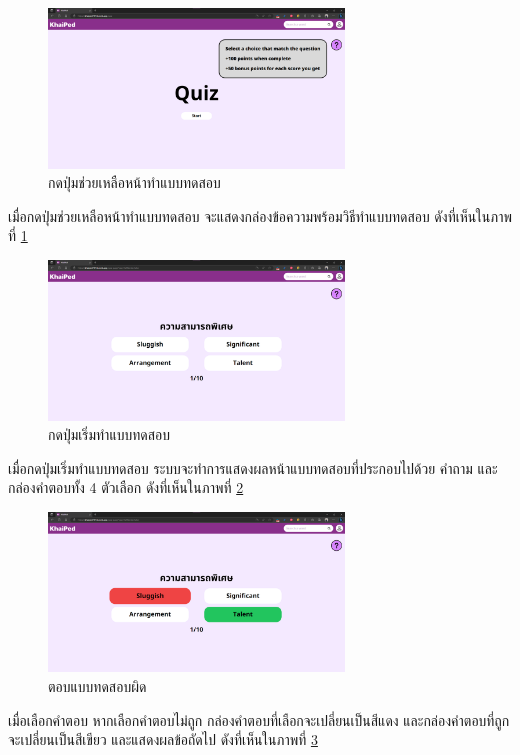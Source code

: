 \documentclass[12pt,oneside,openright,a4paper]{cpe-thai-project}
\begin{document}
\begin{figure}[!h]\centering
	\includegraphics[width=0.7\textwidth, keepaspectratio=true]{image/chap4/UI/quiz/help.png}
	\caption{{กดปุ่มช่วยเหลือหน้าทำแบบทดสอบ}}\label{fig:chap4UIQuizHelp}
\end{figure}
\hspace{1cm}
เมื่อกดปุ่มช่วยเหลือหน้าทำแบบทดสอบ จะแสดงกล่องข้อความพร้อมวิธีทำแบบทดสอบ ดังที่เห็นในภาพที่ \ref{fig:chap4UIQuizHelp}

\pagebreak
\begin{figure}[!h]\centering
	\includegraphics[width=0.7\textwidth, keepaspectratio=true]{image/chap4/UI/quiz/start.png}
	\caption{{กดปุ่มเริ่มทำแบบทดสอบ}}\label{fig:chap4UIQuizStart}
\end{figure}
\hspace{1cm}
เมื่อกดปุ่มเริ่มทำแบบทดสอบ ระบบจะทำการแสดงผลหน้าแบบทดสอบที่ประกอบไปด้วย คำถาม และกล่องคำตอบทั้ง 4 ตัวเลือก
ดังที่เห็นในภาพที่ \ref{fig:chap4UIQuizStart}

\begin{figure}[!h]\centering
	\includegraphics[width=0.7\textwidth, keepaspectratio=true]{image/chap4/UI/quiz/wrong.png}
	\caption{{ตอบแบบทดสอบผิด}}\label{fig:chap4UIQuizWrong}
\end{figure}
\hspace{1cm}
เมื่อเลือกคำตอบ หากเลือกคำตอบไม่ถูก กล่องคำตอบที่เลือกจะเปลี่ยนเป็นสีแดง และกล่องคำตอบที่ถูกจะเปลี่ยนเป็นสีเขียว และแสดงผลข้อถัดไป
ดังที่เห็นในภาพที่ \ref{fig:chap4UIQuizWrong}
\end{document}
